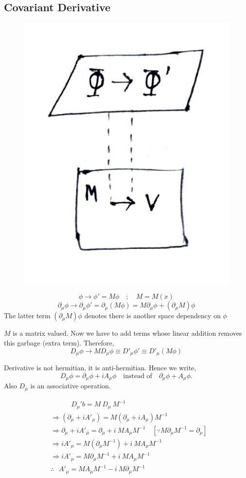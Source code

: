 \documentclass[14pt]{article} %
\begin{document}
\subsection{Covariant Derivative}
\begin{figure}[H]
    \centering
    \includegraphics[width=0.3\linewidth]{figures/C09_3.jpeg}
    \caption*{}
\end{figure}
\vspace{-1.5cm}
\[
\phi \rightarrow \phi' = M \phi \quad; \quad M = M(x)
\]
\[
\partial_\mu \phi \to  \partial_\mu \phi' =\partial_\mu (M \phi) = M \partial_\mu \phi + (\partial_\mu M) \phi
\]
The latter term $(\partial_\mu M) \phi$ denotes there is another space dependency on $\phi$

$M$ is a matrix valued. Now we have to add terms whose linear addition removes this garbage (extra term). Therefore,
\[
D_\mu \phi \to M D_\mu \phi \equiv D'_\mu \phi' \equiv D'_\mu (M \phi)
\]
\begin{tcolorbox}
Derivative is not hermitian, it is anti-hermitian. Hence we write,
\[
D_\mu \phi = \partial_\mu \phi + i A_\mu \phi \quad \text{instead of} \quad \partial_\mu \phi + A_\mu \phi.
\]
Also $D_\mu$ is an associative operation.
\end{tcolorbox}

\begin{align*}
&\quad \quad \quad D_\mu'b = M ~D_\mu ~ M^{-1} \\
&\Rightarrow (\partial_\mu + i A'_\mu) = M (\partial_\mu + i A_\mu) M^{-1} \\
&\Rightarrow \partial_\mu + i A'_\mu = \partial_\mu + i ~M A_\mu M^{-1} \quad [\because M \partial_\mu M^{-1} = \partial_\mu]\\
&\Rightarrow i A'_\mu = M (\partial_\mu M^{-1}) + i~ M A_\mu M^{-1}\\
&\Rightarrow i A'_\mu = M \partial_\mu M^{-1} + i ~M A_\mu M^{-1} \\
&\therefore ~~~ A'_\mu = M A_\mu M^{-1} - i ~M \partial_\mu M^{-1}
\end{align*}
\end{document}
